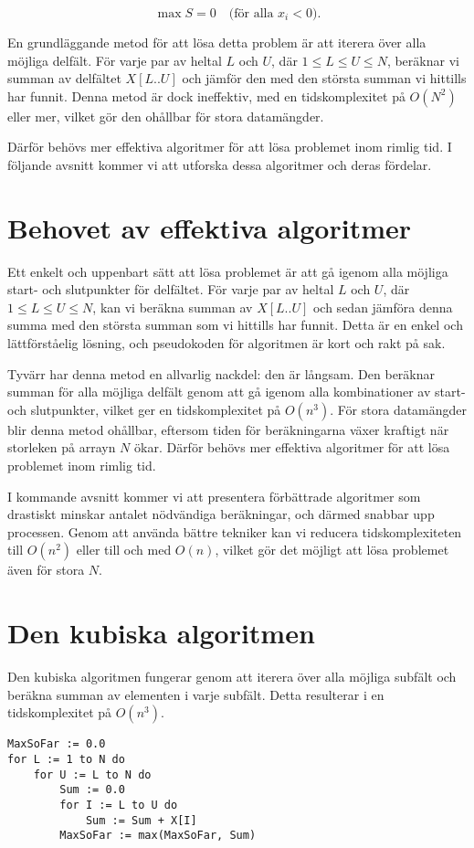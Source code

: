 \documentclass[a4paper,12pt]{article}
\begin{document}
\begin{displaymath}
\max S = 0 \quad \text{(för alla } x_i < 0\text{)}.
\end{displaymath}

En grundläggande metod för att lösa detta problem är att iterera över alla möjliga delfält. För varje par av heltal $L$ och $U$, där $1 \leq L \leq U \leq N$, beräknar vi summan av delfältet $X[L..U]$ och jämför den med den största summan vi hittills har funnit. Denna metod är dock ineffektiv, med en tidskomplexitet på $O(N^2)$ eller mer, vilket gör den ohållbar för stora datamängder.

Därför behövs mer effektiva algoritmer för att lösa problemet inom rimlig tid. I följande avsnitt kommer vi att utforska dessa algoritmer och deras fördelar.


\section{Behovet av effektiva algoritmer}
\label{sec:effektiva-algoritmer}

Ett enkelt och uppenbart sätt att lösa problemet är att gå igenom alla möjliga start- och slutpunkter för delfältet. För varje par av heltal $L$ och $U$, där $1 \leq L \leq U \leq N$, kan vi beräkna summan av $X[L..U]$ och sedan jämföra denna summa med den största summan som vi hittills har funnit. Detta är en enkel och lättförståelig lösning, och pseudokoden för algoritmen är kort och rakt på sak.

Tyvärr har denna metod en allvarlig nackdel: den är långsam. Den beräknar summan för alla möjliga delfält genom att gå igenom alla kombinationer av start- och slutpunkter, vilket ger en tidskomplexitet på $O(n^3)$. För stora datamängder blir denna metod ohållbar, eftersom tiden för beräkningarna växer kraftigt när storleken på arrayn $N$ ökar. Därför behövs mer effektiva algoritmer för att lösa problemet inom rimlig tid.

I kommande avsnitt kommer vi att presentera förbättrade algoritmer som drastiskt minskar antalet nödvändiga beräkningar, och därmed snabbar upp processen. Genom att använda bättre tekniker kan vi reducera tidskomplexiteten till $O(n^2)$ eller till och med $O(n)$, vilket gör det möjligt att lösa problemet även för stora $N$.


\section{Den kubiska algoritmen}
\label{sec:kubisk}
Den kubiska algoritmen fungerar genom att iterera över alla möjliga subfält och beräkna summan av elementen i varje subfält. Detta resulterar i en tidskomplexitet på $O(n^3)$. 
\begin{verbatim}
MaxSoFar := 0.0
for L := 1 to N do
    for U := L to N do
        Sum := 0.0
        for I := L to U do
            Sum := Sum + X[I]
        MaxSoFar := max(MaxSoFar, Sum)
\end{verbatim}
\end{document}

